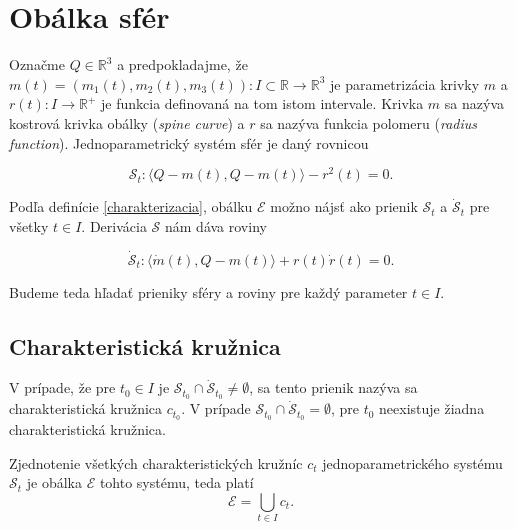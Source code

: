 \section{Obálka sfér}
Označme $Q \in \mathbb{R}^3$ a predpokladajme, že $m(t) = (m_1(t), m_2(t), m_3(t)) \colon I \subset \mathbb{R} \rightarrow \mathbb{R}^3$ je parametrizácia krivky $m$ a $r(t) \colon I \rightarrow \mathbb{R}^{+}$ je funkcia definovaná na tom istom intervale. Krivka $m$ sa nazýva kostrová krivka obálky (\textit{spine curve}) a $r$ sa nazýva funkcia polomeru (\textit{radius function}). Jednoparametrický systém sfér je daný rovnicou

$$
\mathcal{S}_t \colon \langle Q - m(t), Q - m(t) \rangle - r^2(t)= 0.
$$

Podľa definície \ref{charakterizacia}, obálku $\mathcal{E}$ možno nájsť ako prienik $\mathcal{S}_t$ a $\mathcal{\dot{S}}_t$ pre všetky $t \in I$. Derivácia $\mathcal{S}$ nám dáva roviny

$$
\mathcal{\dot{S}}_t \colon \langle \dot{m}(t), Q - m(t) \rangle + r(t) \dot{r}(t) = 0.
$$

Budeme teda hľadať prieniky sféry a roviny pre každý parameter $t \in I$.

\subsection{Charakteristická kružnica}
\begin{definition}
V prípade, že pre $t_0 \in I$ je $\mathcal{S}_{t_0} \cap \mathcal{\dot{S}}_{t_0} \neq \emptyset$, sa tento prienik nazýva sa charakteristická kružnica $c_{t_0}$. V prípade $\mathcal{S}_{t_0} \cap \mathcal{\dot{S}}_{t_0} = \emptyset$, pre \(t_0\) neexistuje žiadna charakteristická kružnica.
\end{definition}

\begin{lemma} \label{lema o zjednoteni charakteristickych kruznic}
Zjednotenie všetkých charakteristických kružníc $c_t$ jednoparametrického systému $\mathcal{S}_t$ je obálka $\mathcal{E}$ tohto systému, teda platí $$\mathcal{E} = \bigcup_{t \in I} c_t.$$
\end{lemma}

